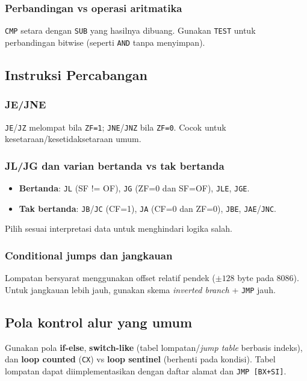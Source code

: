 \subsubsection{Perbandingan vs operasi aritmatika}
\texttt{CMP} setara dengan \texttt{SUB} yang hasilnya dibuang. Gunakan \texttt{TEST} untuk perbandingan bitwise (seperti \texttt{AND} tanpa menyimpan).

\subsection{Instruksi Percabangan}
\subsubsection{JE/JNE}
\texttt{JE}/\texttt{JZ} melompat bila \texttt{ZF=1}; \texttt{JNE}/\texttt{JNZ} bila \texttt{ZF=0}. Cocok untuk kesetaraan/kesetidaksetaraan umum.

\subsubsection{JL/JG dan varian bertanda vs tak bertanda}
\begin{itemize}
  \item \textbf{Bertanda}: \texttt{JL} (SF != OF), \texttt{JG} (ZF=0 dan SF=OF), \texttt{JLE}, \texttt{JGE}.
  \item \textbf{Tak bertanda}: \texttt{JB}/\texttt{JC} (CF=1), \texttt{JA} (CF=0 dan ZF=0), \texttt{JBE}, \texttt{JAE}/\texttt{JNC}.
\end{itemize}
Pilih sesuai interpretasi data untuk menghindari logika salah.

\subsubsection{Conditional jumps dan jangkauan}
Lompatan bersyarat menggunakan offset relatif pendek (\(\pm 128\) byte pada 8086). Untuk jangkauan lebih jauh, gunakan skema \textit{inverted branch} + \texttt{JMP} jauh.

\subsection{Pola kontrol alur yang umum}
Gunakan pola \textbf{if-else}, \textbf{switch-like} (tabel lompatan/\textit{jump table} berbasis indeks), dan \textbf{loop counted} (\texttt{CX}) vs \textbf{loop sentinel} (berhenti pada kondisi). Tabel lompatan dapat diimplementasikan dengan daftar alamat dan \texttt{JMP [BX+SI]}. \cite{intel2019manual32}

